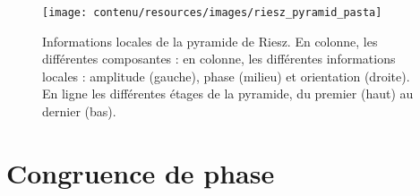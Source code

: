\begin{figure}
    \centering
    \texttt{[image: contenu/resources/images/riesz\_pyramid\_pasta]}
    \caption[Informations locales de la pyramide de Riesz]{Informations locales de la pyramide de Riesz. En colonne, les différentes composantes : en colonne, les différentes informations locales : amplitude (gauche), phase (milieu) et orientation (droite). En ligne les différentes étages de la pyramide, du premier (haut) au dernier (bas).}
    \label{fig:riesz-pyramid-local}
\end{figure}


\section{Congruence de phase}